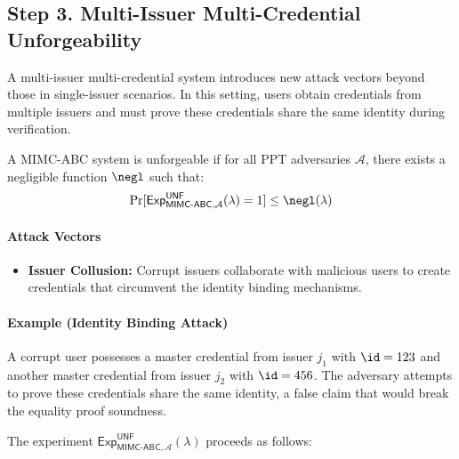 \subsection{Step 3. Multi-Issuer Multi-Credential Unforgeability}

A multi-issuer multi-credential system introduces new attack vectors beyond those in single-issuer scenarios. In this setting, users obtain credentials from multiple issuers and must prove these credentials share the same identity during verification.

\begin{definition}[Unforgeability]
A MIMC-ABC system is unforgeable if for all PPT adversaries $\mathcal{A}$, there exists a negligible function $\negl$ such that:
\[
\Pr[\mathsf{Exp}^{\mathsf{UNF}}_{\mathsf{MIMC\text{-}ABC}, \mathcal{A}}(\lambda) = 1] \leq \negl(\lambda)
\]
\end{definition}

\paragraph{Attack Vectors}
\begin{itemize}
        
    \item \textbf{Issuer Collusion:} Corrupt issuers collaborate with malicious users to create credentials that circumvent the identity binding mechanisms.
\end{itemize}

\paragraph{Example (Identity Binding Attack)} A corrupt user possesses a master credential from issuer $j_1$ with $\id=123$ and another master credential from issuer $j_2$ with $\id=456$. The adversary attempts to prove these credentials share the same identity, a false claim that would break the equality proof soundness.

\noindent The experiment $\mathsf{Exp}^{\mathsf{UNF}}_{\mathsf{MIMC\text{-}ABC}, \mathcal{A}}(\lambda)$ proceeds as follows:

